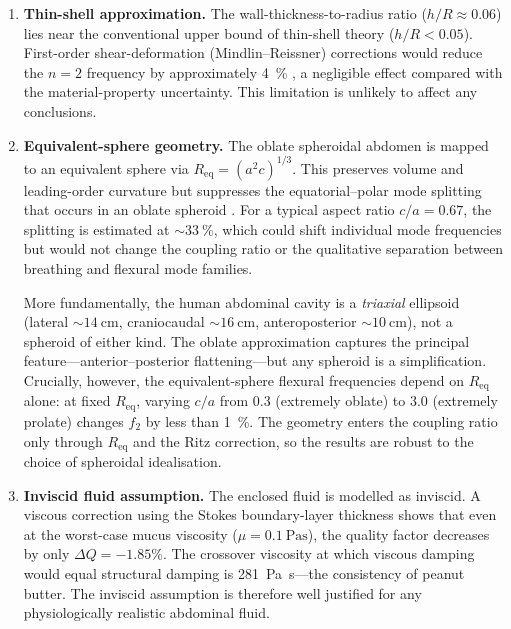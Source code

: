 \begin{enumerate}
  \item \textbf{Thin-shell approximation.}  The wall-thickness-to-radius
    ratio ($h/R \approx 0.06$) lies near the conventional upper bound of
    thin-shell theory ($h/R < 0.05$).  First-order shear-deformation
    (Mindlin--Reissner) corrections would reduce the $n = 2$ frequency by
    approximately \SI{4}{\percent} \cite{Soedel2004}, a negligible effect
    compared with the material-property uncertainty.  This limitation is
    unlikely to affect any conclusions.

  \item \textbf{Equivalent-sphere geometry.}  The oblate spheroidal
    abdomen is mapped to an equivalent sphere via $R_{\mathrm{eq}} =
    (a^2 c)^{1/3}$.  This preserves volume and leading-order curvature
    but suppresses the equatorial--polar mode splitting that occurs in
    an oblate spheroid \cite{Leissa1973}.  For a typical aspect ratio
    $c/a = 0.67$, the splitting is estimated at ${\sim}\SI{33}{\percent}$,
    which could shift individual mode frequencies but would not change the
    coupling ratio or the qualitative separation between breathing and
    flexural mode families.

    More fundamentally, the human abdominal cavity is a \emph{triaxial}
    ellipsoid (lateral ${\sim}\SI{14}{\centi\metre}$, craniocaudal
    ${\sim}\SI{16}{\centi\metre}$, anteroposterior
    ${\sim}\SI{10}{\centi\metre}$), not a spheroid of either kind.  The
    oblate approximation captures the principal feature---anterior--posterior
    flattening---but any spheroid is a simplification.  Crucially, however,
    the equivalent-sphere flexural frequencies depend on $R_{\mathrm{eq}}$
    alone: at fixed $R_{\mathrm{eq}}$, varying $c/a$ from 0.3 (extremely
    oblate) to 3.0 (extremely prolate) changes $f_2$ by less than
    \SI{1}{\percent}.  The geometry enters the coupling ratio only through
    $R_{\mathrm{eq}}$ and the Ritz correction, so the results are robust to
    the choice of spheroidal idealisation.

  \item \textbf{Inviscid fluid assumption.}  The enclosed fluid is modelled
    as inviscid.  A viscous correction using the Stokes boundary-layer
    thickness shows that even at the worst-case mucus viscosity
    ($\mu = \SI{0.1}{\pascal\second}$), the quality factor decreases by only
    $\Delta Q = -1.85\%$.  The crossover viscosity at which viscous damping
    would equal structural damping is \SI{281}{\pascal\second}---the
    consistency of peanut butter.  The inviscid assumption is therefore
    well justified for any physiologically realistic abdominal fluid.


\end{enumerate}
